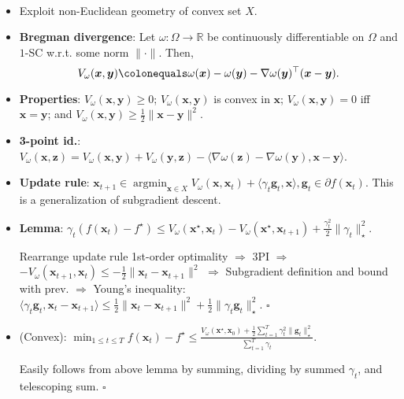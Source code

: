 \documentclass[8pt,a4paper]{extarticle}
\renewcommand{\proof}[1]{\begin{tcolorbox}#1 \hfill $\square$\end{tcolorbox}}
\DeclareMathOperator*{\argmin}{argmin}
\newcommand{\R}{\mathbb{R}}
\renewcommand{\vec}[1]{\bm{#1}}
\newenvironment{topic}[1]
{\textbf{\sffamily \colorbox{black}{\rlap{\textbf{\textcolor{white}{#1}}}\hspace{\linewidth}\hspace{-2\fboxsep}}} \\ \vspace{0.2cm}}
{}
\begin{document}
\begin{multicols*}{2}
    \begin{topic}{Mirror descent}
        \begin{itemize}
            \item Exploit non-Euclidean geometry of convex set $X$.
            \item \textbf{Bregman divergence}: Let $\omega: \Omega \to \R$ be continuously differentiable on $\Omega$ and $1$-SC w.r.t. some norm $\| \cdot \|$. Then, \[
                      V_{\omega}(\vec{x}, \vec{y}) \colonequals \omega(\vec{x}) - \omega(\vec{y}) - \nabla \omega(\vec{y})^\top (\vec{x} - \vec{y}).
                  \]
            \item \textbf{Properties}: $V_{\omega}(\vec{x}, \vec{y}) \geq 0$; $V_{\omega}(\vec{x}, \vec{y})$ is convex in $\vec{x}$; $V_{\omega}(\vec{x}, \vec{y}) = 0$ iff $\vec{x} = \vec{y}$; and $V_{\omega}(\vec{x}, \vec{y}) \geq \frac{1}{2} \| \vec{x} - \vec{y} \|^2$.
            \item \textbf{3-point id.}: $V_{\omega}(\vec{x}, \vec{z}) = V_{\omega}(\vec{x}, \vec{y}) + V_{\omega}(\vec{y}, \vec{z}) - \langle \nabla \omega(\vec{z}) - \nabla \omega(\vec{y}), \vec{x} - \vec{y} \rangle$.
            \item \textbf{Update rule}: $\vec{x}_{t+1} \in \argmin_{\vec{x} \in X} V_{\omega}(\vec{x}, \vec{x}_t) + \langle \gamma_t \vec{g}_t, \vec{x} \rangle, \vec{g}_t \in \partial f(\vec{x}_t)$. This is a generalization of subgradient descent.
            \item \textbf{Lemma}: $\gamma_t(f(\vec{x}_t) - f^\star) \leq V_{\omega}(\vec{x}^\star, \vec{x}_t) - V_{\omega}(\vec{x}^\star, \vec{x}_{t+1}) + \frac{\gamma_t^2}{2} \| \gamma_t \|_\star^2$.
                  \proof{Rearrange update rule 1st-order optimality $\Rightarrow$ 3PI $\Rightarrow$ $-V_{\omega}(\vec{x}_{t+1}, \vec{x}_t) \leq -\frac{1}{2}\| \vec{x}_t - \vec{x}_{t+1} \|^2$ $\Rightarrow$ Subgradient definition and bound with prev. $\Rightarrow$ Young's inequality: $\langle \gamma_t \vec{g}_t, \vec{x}_t - \vec{x}_{t+1} \rangle \leq \frac{1}{2} \| \vec{x}_t - \vec{x}_{t+1} \|^2 + \frac{1}{2} \| \gamma_t \vec{g}_t \|^2_\star$.}
            \item (Convex): $\min_{1\leq t\leq T} f(\vec{x}_t) - f^\star \leq \frac{V_{\omega}(\vec{x}^\star, \vec{x}_0) + \frac{1}{2} \sum_{t=1}^{T} \gamma_t^2 \| \vec{g}_t \|_\star^2}{\sum_{t=1}^{T} \gamma_t}$.
                  \proof{Easily follows from above lemma by summing, dividing by summed $\gamma_t$, and telescoping sum.}
        \end{itemize}
    \end{topic}


\end{multicols*}
\end{document}
